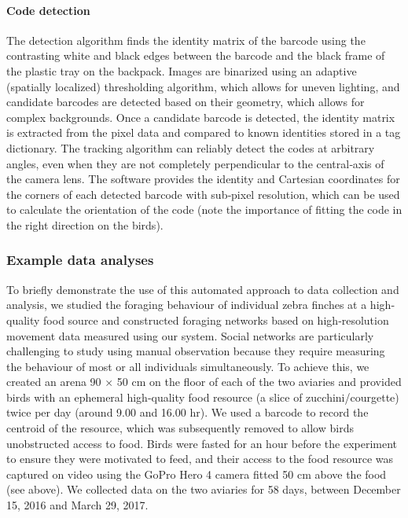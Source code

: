 \documentclass[11pt,a4paper,oneside]{article}
\begin{document}
\paragraph{Code detection}
The detection algorithm finds the identity matrix of the barcode using the contrasting white and black edges between the barcode and the black frame of the plastic tray on the backpack. Images are binarized using an adaptive (spatially localized) thresholding algorithm, which allows for uneven lighting, and candidate barcodes are detected based on their geometry, which allows for complex backgrounds. Once a candidate barcode is detected, the identity matrix is extracted from the pixel data and compared to known identities stored in a tag dictionary. The tracking algorithm can reliably detect the codes at arbitrary angles, even when they are not completely perpendicular to the central‐axis of the camera lens. The software provides the identity and Cartesian coordinates for the corners of each detected barcode with sub‐pixel resolution, which can be used to calculate the orientation of the code (note the importance of fitting the code in the right direction on the birds).

\subsubsection{Example data analyses}
To briefly demonstrate the use of this automated approach to data collection and analysis, we studied the foraging behaviour of individual zebra finches at a high‐quality food source and constructed foraging networks based on high‐resolution movement data measured using our system. Social networks are particularly challenging to study using manual observation because they require measuring the behaviour of most or all individuals simultaneously. To achieve this, we created an arena 90 × 50 cm on the floor of each of the two aviaries and provided birds with an ephemeral high‐quality food resource (a slice of zucchini/courgette) twice per day (around 9.00 and 16.00 hr). We used a barcode to record the centroid of the resource, which was subsequently removed to allow birds unobstructed access to food. Birds were fasted for an hour before the experiment to ensure they were motivated to feed, and their access to the food resource was captured on video using the GoPro Hero 4 camera fitted 50 cm above the food (see above). We collected data on the two aviaries for 58 days, between December 15, 2016 and March 29, 2017.
\end{document}
